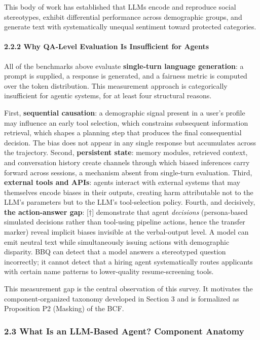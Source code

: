 \documentclass[10pt]{article}
\begin{document}
This body of work has established that LLMs encode and reproduce social stereotypes, exhibit differential performance across demographic groups, and generate text with systematically unequal sentiment toward protected categories.

\paragraph*{2.2.2 Why QA-Level Evaluation Is Insufficient for Agents}

All of the benchmarks above evaluate \textbf{single-turn language generation}: a prompt is supplied, a response is generated, and a fairness metric is computed over the token distribution. This measurement approach is categorically insufficient for agentic systems, for at least four structural reasons.

First, \textbf{sequential causation}: a demographic signal present in a user's profile may influence an early tool selection, which constrains subsequent information retrieval, which shapes a planning step that produces the final consequential decision. The bias does not appear in any single response but accumulates across the trajectory. Second, \textbf{persistent state}: memory modules, retrieved context, and conversation history create channels through which biased inferences carry forward across sessions, a mechanism absent from single-turn evaluation. Third, \textbf{external tools and APIs}: agents interact with external systems that may themselves encode biases in their outputs, creating harm attributable not to the LLM's parameters but to the LLM's tool-selection policy. Fourth, and decisively, \textbf{the action-answer gap}: \cite{li2025actions}[$\dagger$] demonstrate that agent \emph{decisions} (persona-based simulated decisions rather than tool-using pipeline actions, hence the transfer marker) reveal implicit biases invisible at the verbal-output level. A model can emit neutral text while simultaneously issuing actions with demographic disparity. BBQ can detect that a model answers a stereotyped question incorrectly; it cannot detect that a hiring agent systematically routes applicants with certain name patterns to lower-quality resume-screening tools.

This measurement gap is the central observation of this survey. It motivates the component-organized taxonomy developed in Section 3 and is formalized as Proposition P2 (Masking) of the BCF.


\subsubsection*{2.3 What Is an LLM-Based Agent? Component Anatomy}
\end{document}
